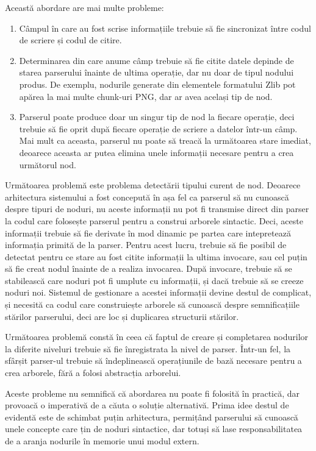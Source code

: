 \documentclass[a4paper,12pt]{report}
\begin{document}
Această abordare are mai multe probleme:
\begin{enumerate}
    \item
        Câmpul în care au fost scrise informațiile trebuie să fie sincronizat
        între codul de scriere și codul de citire.
    \item
        Determinarea din care anume câmp trebuie să fie citite datele
        depinde de starea parserului înainte de ultima operație,
        dar nu doar de tipul nodului produs.
        De exemplu, nodurile generate din elementele formatului Zlib pot apărea
        la mai multe chunk-uri \ac{PNG}, dar ar avea același tip de nod.
    \item
        Parserul poate produce doar un singur tip de nod la fiecare operație, deci trebuie
        să fie oprit după fiecare operație de scriere a datelor într-un câmp.
        Mai mult ca aceasta, parserul nu poate să treacă la următoarea stare imediat,
        deoarece aceasta ar putea elimina unele informații necesare pentru a crea următorul nod.
\end{enumerate}

Următoarea problemă este problema detectării tipului curent de nod.
Deoarece arhitectura sistemului a fost concepută în așa fel ca parserul să nu cunoască despre tipuri de noduri,
nu aceste informații nu pot fi transmise direct din parser la codul care folosește parserul pentru
a construi arborele sintactic.
Deci, aceste informații trebuie să fie derivate în mod dinamic pe partea
care intepretează informația primită de la parser.
Pentru acest lucru, trebuie să fie posibil de detectat pentru ce stare au fost citite informații
la ultima invocare, sau cel puțin să fie creat nodul înainte de a realiza invocarea.
După invocare, trebuie să se stabilească care noduri pot fi umplute cu informații,
și dacă trebuie să se creeze noduri noi.
Sistemul de gestionare a acestei informații devine destul de complicat,
și necesită ca codul care construiește arborele să cunoască despre semnificațiile stărilor parserului,
deci are loc și duplicarea structurii stărilor.

Următoarea problemă constă în ceea că faptul de creare
și completarea nodurilor la diferite niveluri trebuie să fie înregistrata la nivel de parser.
Într-un fel, la sfârșit parser-ul trebuie să îndeplinească operațiunile
de bază necesare pentru a crea arborele, fără a folosi abstracția arborelui.

Aceste probleme nu semnifică că abordarea nu poate fi folosită în practică,
dar provoacă o imperativă de a căuta o soluție alternativă.
Prima idee destul de evidentă este de schimbat puțin arhitectura,
permițând parserului să cunoască unele concepte care țin de noduri sintactice,
dar totuși să lase responsabilitatea de a aranja nodurile în memorie unui modul extern.
\end{document}
